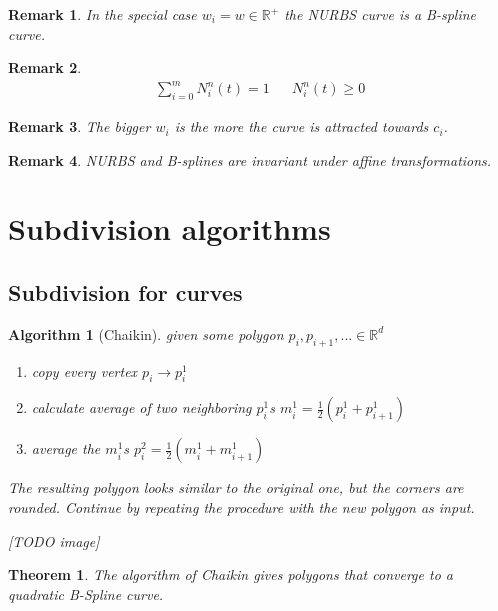 \documentclass[]{article}
\newtheorem{theorem}{Theorem}
\newtheorem{algorithm}{Algorithm}
\newtheorem{remark}{Remark}
\begin{document}
\begin{remark}
	In the special case $w_i = w \in \mathbb{R}^+$ the NURBS curve is a B-spline curve.
\end{remark}

\begin{remark}
	\begin{align*}
		\sum_{i=0}^{m} N_i^n(t) = 1 && N_i^n(t) \geq 0
	\end{align*}
\end{remark}

\begin{remark}
	The bigger $w_i$ is the more the curve is attracted towards $c_i$.
\end{remark}

\begin{remark}
	NURBS and B-splines are invariant under affine transformations.
\end{remark}

\section{Subdivision algorithms}

\subsection{Subdivision for curves}

\begin{algorithm}[Chaikin]
	given some polygon $p_i, p_{i+1}, ... \in \mathbb{R}^d$
	
	\begin{enumerate}
		\item copy every vertex $p_i \rightarrow p_i^1$
		\item calculate average of two neighboring $p_i^1$s $m_i^1 = \frac{1}{2}(p_i^1 + p_{i+1}^1)$
		\item average the $m_i^1$s $p_i^2 = \frac{1}{2}(m_i^1 + m_{i+1}^1)$
	\end{enumerate}
	
	The resulting polygon looks similar to the original one, but the corners are rounded. Continue by repeating the procedure with the new polygon as input.
	
	[TODO image]
\end{algorithm}

\begin{theorem}
	The algorithm of Chaikin gives polygons that converge to a quadratic B-Spline curve.
\end{theorem}
\end{document}
